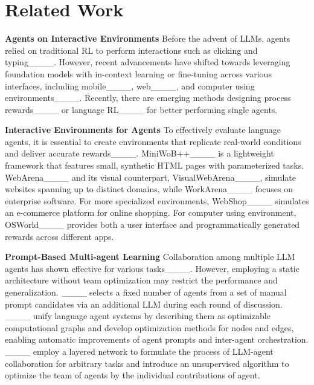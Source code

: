 \section{Related Work}
\label{gen_inst}
\noindent\textbf{Agents on Interactive Environments} \quad Before the advent of LLMs, agents relied on traditional RL to perform interactions such as clicking and typing____. However, recent advancements have shifted towards leveraging foundation models with in-context learning or fine-tuning across various interfaces, including mobile____, web____, and computer using environments____. Recently, there are emerging methods designing process rewards____ or language RL____ for better performing single agents. 

\noindent\textbf{Interactive Environments for Agents} \quad To effectively evaluate language agents, it is essential to create environments that replicate real-world conditions and deliver accurate rewards____. MiniWoB++____ is a lightweight framework that features small, synthetic HTML pages with parameterized tasks. WebArena____ and its visual counterpart, VisualWebArena____, simulate websites spanning up to distinct domains, while WorkArena____ focuses on enterprise software. For more specialized environments, WebShop____ simulates an e-commerce platform for online shopping. For computer using environment, OSWorld____ provides both a user interface and programmatically generated rewards across different apps.

\noindent\textbf{Prompt-Based Multi-agent Learning} \quad Collaboration among multiple LLM agents has shown effective for various tasks____. However, employing a static architecture without team optimization may restrict the performance and generalization. ____ selects a fixed number of agents from a set of manual prompt candidates via an additional LLM during each round of discussion. %
____ unify language agent systems by describing them as optimizable computational graphs and develop optimization methods for nodes and edges, enabling automatic improvements of agent prompts and inter-agent orchestration. ____ employ a layered network to formulate the process of LLM-agent collaboration for arbitrary tasks and introduce an unsupervised algorithm to optimize the team of agents by the individual contributions of agent.